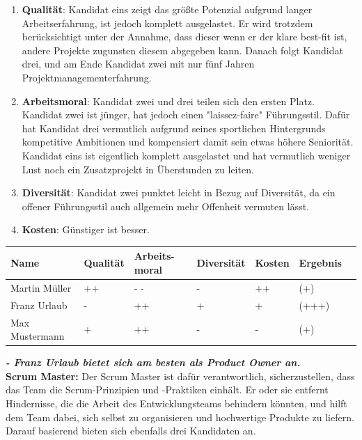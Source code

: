 \begin{enumerate}
\item \textbf{Qualität}:
Kandidat eins zeigt das größte Potenzial aufgrund langer Arbeitserfahrung, ist jedoch komplett ausgelastet. Er wird trotzdem berücksichtigt unter der Annahme, dass dieser wenn er der klare best-fit ist, andere Projekte zugunsten diesem abgegeben kann. Danach folgt Kandidat drei, und am Ende Kandidat zwei mit nur fünf Jahren Projektmanagementerfahrung.

\item \textbf{Arbeitsmoral}:
Kandidat zwei und drei teilen sich den ersten Platz. Kandidat zwei ist jünger, hat jedoch einen "laissez-faire" Führungsstil. Dafür hat Kandidat drei vermutlich aufgrund seines sportlichen Hintergrunds kompetitive Ambitionen und kompensiert damit sein etwas höhere Seniorität. Kandidat eins ist eigentlich komplett ausgelastet und hat vermutlich weniger Lust noch ein Zusatzprojekt in Überstunden zu leiten.

\item \textbf{Diversität}:
Kandidat zwei punktet leicht in Bezug auf Diversität, da ein offener Führungsstil auch allgemein mehr Offenheit vermuten lässt.

\item \textbf{Kosten}:
Günstiger ist besser.
\end{enumerate}


\begin{center}
\small
\begin{tabularx}{\textwidth}{|l|X|X|X|X|X|X|}
\hline
\textbf{Name} & \textbf{Qualität} & \textbf{Arbeits-moral} & \textbf{Diversität} & \textbf{Kosten} & \textbf{Ergebnis} \\
\hline
Martin Müller & ++ & - - & - & ++ & (+) \\
\hline
Franz Urlaub & - & ++ & + & + & (+++) \\
\hline
Max Mustermann & + & ++ & - & - & (+) \\
\hline
\end{tabularx}
\end{center}

\textit{\textbf{- Franz Urlaub bietet sich am besten als Product Owner an.}}
\vspace*{0.1cm} \\
\textbf{Scrum Master:} Der Scrum Master ist dafür verantwortlich, sicherzustellen, dass das Team die Scrum-Prinzipien und -Praktiken einhält. Er oder sie entfernt Hindernisse, die die Arbeit des Entwicklungsteams behindern könnten, und hilft dem Team dabei, sich selbst zu organisieren und hochwertige Produkte zu liefern. Darauf basierend bieten sich ebenfalls drei Kandidaten an.

